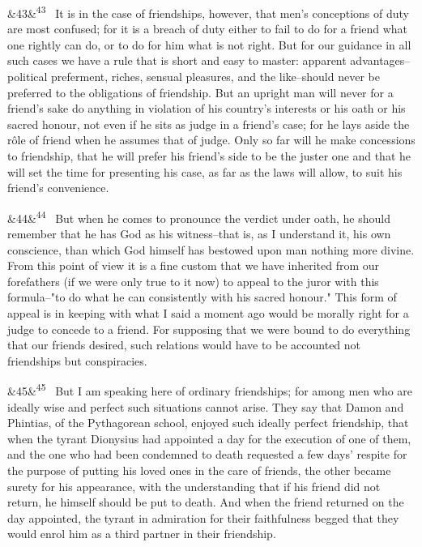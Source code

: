 \documentclass[12pt]{article}
\newcommand{\para}[1][]{\par\noindent\ifx&#1&\else\textsuperscript{\footnotesize #1}~\fi}
\begin{document}
\para[43] It is in the case of friendships, however, that men's conceptions of duty are most confused; for it is a breach of duty either to fail to do for a friend what one rightly can do, or to do for him what is not right. But for our guidance in all such cases we have a rule that is short and easy to master: apparent advantages--political preferment, riches, sensual pleasures, and the like--should never be preferred to the obligations of friendship. But an upright man will never for a friend's sake do anything in violation of his country's interests or his oath or his sacred honour, not even if he sits as judge in a friend's case; for he lays aside the rôle of friend when he assumes that of judge. Only so far will he make concessions to friendship, that he will prefer his friend's side to be the juster one and that he will set the time for presenting his case, as far as the laws will allow, to suit his friend's convenience.

\para[44] But when he comes to pronounce the verdict under oath, he should remember that he has God as his witness--that is, as I understand it, his own conscience, than which God himself has bestowed upon man nothing more divine. From this point of view it is a fine custom that we have inherited from our forefathers (if we were only true to it now) to appeal to the juror with this formula--"to do what he can consistently with his sacred honour." This form of appeal is in keeping with what I said a moment ago would be morally right for a judge to concede to a friend. For supposing that we were bound to do everything that our friends desired, such relations would have to be accounted not friendships but conspiracies.

\para[45] But I am speaking here of ordinary friendships; for among men who are ideally wise and perfect such situations cannot arise. They say that Damon and Phintias, of the Pythagorean school, enjoyed such ideally perfect friendship, that when the tyrant Dionysius had appointed a day for the execution of one of them, and the one who had been condemned to death requested a few days' respite for the purpose of putting his loved ones in the care of friends, the other became surety for his appearance, with the understanding that if his friend did not return, he himself should be put to death. And when the friend returned on the day appointed, the tyrant in admiration for their faithfulness begged that they would enrol him as a third partner in their friendship.
\end{document}

